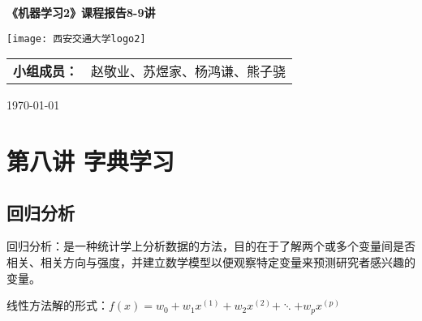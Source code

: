 \documentclass[10pt, a4paper]{article}
\begin{document}
	
	\begin{titlepage}
		\begin{center}
			\vspace*{3cm}
			
			\Huge
			\textbf{《机器学习2》课程报告8-9讲}
			
			\vspace{1cm}
	
			\vspace{3.5cm}
					\texttt{[image: 西安交通大学logo2]}
			
			\vfill
			
			
			\Large
			\begin{center}
				\begin{tabular}{rl}
					\textbf{小组成员：}& 赵敬业、苏煜家、杨鸿谦、熊子骁 
				\end{tabular}
			\end{center}




			
			\Large
			
			\today
			
		\end{center}
	\end{titlepage}
	
	
\newpage
\tableofcontents
\newpage

\section{第八讲 字典学习}
\subsection{回归分析}

回归分析：是一种统计学上分析数据的方法，目的在于了解两个或多个变量间是否相关、相关方向与强度，并建立数学模型以便观察特定变量来预测研究者感兴趣的变量。

线性方法解的形式：$f(x)=w_0+w_1x^{(1)}+w_2x^{(2)}+\ddots+w_px^{(p)}$
\end{document}
